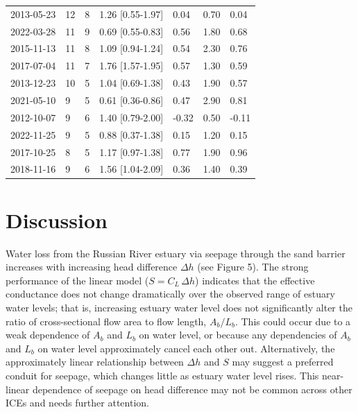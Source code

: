 \documentclass[preprint,12pt,authoryear]{elsarticle}
\begin{document}
\begin{table}[]
\begin{tabular}{lllll|ll}
2013-05-23 & 12 & 8 & 1.26 [0.55-1.97] & 0.04 & 0.70 & 0.04 \\
2022-03-28 & 11 & 9 & 0.69 [0.55-0.83] & 0.56 & 1.80 & 0.68 \\
2015-11-13 & 11 & 8 & 1.09 [0.94-1.24] & 0.54 & 2.30 & 0.76 \\
2017-07-04 & 11 & 7 & 1.76 [1.57-1.95] & 0.57 & 1.30 & 0.59 \\
2013-12-23 & 10 & 5 & 1.04 [0.69-1.38] & 0.43 & 1.90 & 0.57 \\
2021-05-10 & 9 & 5 & 0.61 [0.36-0.86] & 0.47 & 2.90 & 0.81 \\
2012-10-07 & 9 & 6 & 1.40 [0.79-2.00] & -0.32 & 0.50 & -0.11 \\
2022-11-25 & 9 & 5 & 0.88 [0.37-1.38] & 0.15 & 1.20 & 0.15 \\
2017-10-25 & 8 & 5 & 1.17 [0.97-1.38] & 0.77 & 1.90 & 0.96 \\
2018-11-16 & 9 & 6 & 1.56 [1.04-2.09] & 0.36 & 1.40 & 0.39 \\
\end{tabular}
    \label{tab:closures}
\end{table}


\section{Discussion}



Water loss from the Russian River estuary via seepage through the sand barrier  increases with increasing head difference $\Delta h$ (see Figure 5).
The strong performance of the linear model ($S = C_L\,\Delta h$) indicates that the effective conductance does not change dramatically over the observed range of estuary water levels; that is, increasing estuary water level does not significantly alter the ratio of cross-sectional flow area to flow length, $A_b/L_b$. This could occur due to a weak dependence of $A_b$ and $L_b$ on water level, or because any dependencies of $A_b$ and $L_b$ on water level approximately cancel each other out. 
Alternatively, the approximately linear relationship between $\Delta h$ and $S$ may suggest a preferred conduit for seepage, which changes little as estuary water level rises. This near-linear dependence of seepage on head difference may not be common across other ICEs and needs further attention.  
\end{document}
